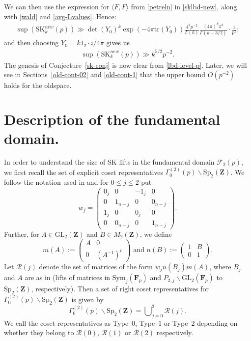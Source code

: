 \documentclass[11pt]{amsart}
\numberwithin{equation}{section}
\theoremstyle{plain}
\theoremstyle{definition}
\newcommand{\conjref}[1]{Conjecture~\ref{#1}}
\newcommand{\mf}{\mathbf}
\newcommand{\mc}{\mathcal}
\newcommand{\mrm}{\mathrm}
\newcommand{\tr}{\mathrm{tr}}
\newcommand{\lan}{\langle }
\newcommand{\ran}{\rangle}
\newcommand{\smat}[4]{\left( \begin{smallmatrix}#1&#2\\#3&#4\end{smallmatrix}\right)}
\newcommand{\GL}{\mrm{GL}}
\newcommand{\sptwo}{\mrm{Sp}_2( \mf Z)}
\newcommand{\Gp}{\Gamma_0^{(2)}(p)}
\newcommand{\gp}{\Gamma^{(2)}_0(p)}
\newcommand{\skk}{\mrm{SK}_k}
\begin{document}
We can then use the expression for $\lan F, F \ran $ from \eqref{petreln} in \eqref{sklbd-new}, along with \eqref{wald} and \eqref{avg-Lvalues}. Hence:
\begin{align}
     \sup(\skk^{new}(p)) \gg \det(Y_0)^k \exp(-4 \pi \tr(Y_0))  \frac{4^k p^{-2}}{\Gamma(k)}  \frac{(4 \pi)^k \pi^k}{\Gamma(k-3/2)}  \cdot \frac{1}{p^2};
\end{align}
and then choosing $Y_0= k 1_2 \cdot i/4 \pi$ gives us 
\begin{align} \label{lbd-level-p}
    \sup(\skk^{new}(p)) \gg k^{5/2} p^{-2}.
 \end{align}
The genesis of \conjref{sk-conj} is now clear from \eqref{lbd-level-p}. Later, we will see in Sections~\ref{old-cont-02} and \ref{old-cont-1} that the upper bound $O(p^{-2})$ holds for the oldspace.

\section{Description of the fundamental domain.}\label{fund-dom}
In order to understand the size of SK lifts in the fundamental domain $\mc F_2(p)$, we first recall the set of explicit coset representatives $\Gp \backslash \sptwo$. We follow the notation used in \cite{BNmodp} and for $0\le j\le 2$ put
\begin{equation}
    w_j=\begin{pmatrix}
        0_j & 0 & -1_{j} & 0\\
        0 & 1_{n-j} & 0 & 0_{n-j}\\
        1_{j} & 0 & 0_{j} & 0\\
        0 & 0_{n-j} & 0 & 1_{n-j}
    \end{pmatrix}.
\end{equation}
Further, for $A\in \GL_2(\mf Z)$ and $B\in M_2 (\mf Z)$, we define
\begin{equation}
m(A):=\smat{A}{0}{0}{(A^{-1})^t} \text{ and } n(B):=\smat{1}{B}{0}{1}.
\end{equation}
Let $\mc R(j)$ denote the set of matrices of the form $w_j n(B_j) m(A)$, where $B_j$ and $A$ are as in \cite{BNmodp} (lifts of matrices in $\mrm{Sym}_j(\mf F_p)$ and $P_{2,j}\backslash \GL_2(\mf F_p)$ to $\sptwo$, respectively). Then a set of right coset representatives for $\gp \backslash \sptwo$ is given by
\begin{equation}
    \gp \backslash \sptwo =\bigcup \nolimits_{j=0}^{2} \mc R(j).
\end{equation}
We call the coset representatives as Type~0, Type~1 or Type~2 depending on whether they belong to $\mc R(0)$, $\mc R(1)$ or $\mc R(2)$ respectively.
\end{document}
